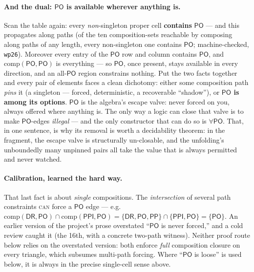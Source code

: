 \documentclass[11pt]{article}
\newcommand{\DR}{\ensuremath{\mathsf{DR}}}
\newcommand{\PO}{\ensuremath{\mathsf{PO}}}
\newcommand{\PP}{\ensuremath{\mathsf{PP}}}
\newcommand{\PPI}{\ensuremath{\mathsf{PPI}}}
\newcommand{\Comp}{\mathrm{comp}}
\newcommand{\code}[1]{\texttt{#1}}
\begin{document}
\paragraph{And the dual: $\PO$ is available wherever anything is.} Scan
the table again: every \emph{non}-singleton proper cell
\textbf{contains} $\PO$ --- and this propagates along paths (of the ten
composition-sets reachable by composing along paths of any length,
every non-singleton one contains $\PO$; machine-checked, \code{wp26}).
Moreover every entry of the $\PO$ row and column contains $\PO$, and
$\Comp(\PO,\PO)$ is everything --- so $\PO$, once present, stays
available in every direction, and an all-$\PO$ region constrains
nothing. Put the two facts together and every pair of elements faces a
clean dichotomy: either some composition path \emph{pins} it (a
singleton --- forced, deterministic, a recoverable ``shadow''), or
\textbf{$\PO$ is among its options}. $\PO$ is the algebra's escape
valve: never forced on you, always offered where anything is. The only
way a logic can close that valve is to make $\PO$-edges \emph{illegal}
--- and the only constructor that can do so is $\forall\PO$. That, in
one sentence, is why its removal is worth a decidability theorem: in
the fragment, the escape valve is structurally un-closable, and the
unfolding's unboundedly many unpinned pairs all take the value that is
always permitted and never watched.

\paragraph{Calibration, learned the hard way.} That last fact is about
\emph{single} compositions. The \emph{intersection} of several path
constraints \textsc{can} force a $\PO$ edge --- e.g.
$\Comp(\DR,\PO)\cap\Comp(\PPI,\PO)=\{\DR,\PO,\PP\}\cap\{\PPI,\PO\}=\{\PO\}$.
An earlier version of the project's prose overstated ``$\PO$ is never
forced,'' and a cold review caught it (the 16th, with a concrete
two-path witness). Neither proof route below relies on the overstated
version: both enforce \emph{full} composition closure on every
triangle, which subsumes multi-path forcing. Where ``$\PO$ is loose''
is used below, it is always in the precise single-cell sense above.
\end{document}
